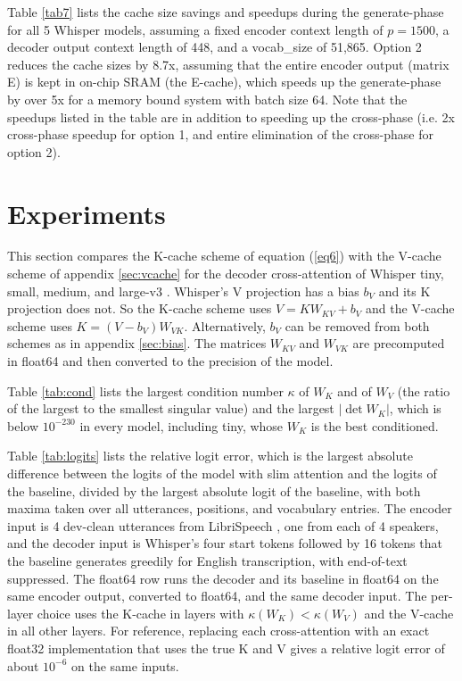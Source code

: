 \documentclass{article}
\begin{document}
Table \ref{tab7} lists the cache size savings and speedups during the generate-phase for all 5 Whisper models, assuming a fixed encoder context length of $p = 1500$, a decoder output context length of 448, and a vocab\_size of 51,865. Option 2 reduces the cache sizes by 8.7x, assuming that the entire encoder output (matrix E) is kept in on-chip SRAM (the E-cache), which speeds up the generate-phase by over 5x for a memory bound system with batch size 64. Note that the speedups listed in the table are in addition to speeding up the cross-phase (i.e. 2x cross-phase speedup for option 1, and entire elimination of the cross-phase for option 2).


\section{Experiments} \label{sec:experiments}
This section compares the K-cache scheme of equation (\ref{eq6}) with the V-cache scheme of appendix \ref{sec:vcache} for the decoder cross-attention of Whisper tiny, small, medium, and large-v3 \citep{whisper}. Whisper's V projection has a bias $b_V$ and its K projection does not. So the K-cache scheme uses ${V = K W_{KV} + b_V}$ and the V-cache scheme uses ${K = (V - b_V) W_{VK}}$. Alternatively, $b_V$ can be removed from both schemes as in appendix \ref{sec:bias}. The matrices $W_{KV}$ and $W_{VK}$ are precomputed in float64 and then converted to the precision of the model.

Table \ref{tab:cond} lists the largest condition number $\kappa$ of $W_K$ and of $W_V$ (the ratio of the largest to the smallest singular value) and the largest $\lvert\det W_K\rvert$, which is below $10^{-230}$ in every model, including tiny, whose $W_K$ is the best conditioned. %


Table \ref{tab:logits} lists the relative logit error, which is the largest absolute difference between the logits of the model with slim attention and the logits of the baseline, divided by the largest absolute logit of the baseline, with both maxima taken over all utterances, positions, and vocabulary entries. The encoder input is 4 dev-clean utterances from LibriSpeech \citep{librispeech}, one from each of 4 speakers, and the decoder input is Whisper's four start tokens followed by 16 tokens that the baseline generates greedily for English transcription, with end-of-text suppressed. The float64 row runs the decoder and its baseline in float64 on the same encoder output, converted to float64, and the same decoder input. The per-layer choice uses the K-cache in layers with $\kappa(W_K) < \kappa(W_V)$ and the V-cache in all other layers. For reference, replacing each cross-attention with an exact float32 implementation that uses the true K and V gives a relative logit error of about $10^{-6}$ on the same inputs.
\end{document}

